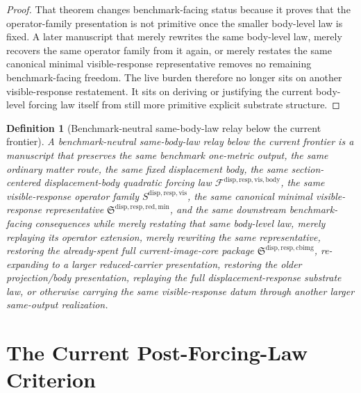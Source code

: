\documentclass[11pt]{article}
\newcommand{\VisibleBodyForcingLaw}{\mathscr F^{\mathrm{disp,resp,vis,body}}}
\newcommand{\VisibleResponseOperator}{S^{\mathrm{disp,resp,vis}}}
\newcommand{\MinimalReducedStructure}{\mathfrak S^{\mathrm{disp,resp,red,min}}}
\newcommand{\CurrentBodyImageCore}{\mathfrak S^{\mathrm{disp,resp,cbimg}}}
\newtheorem{definition}{Definition}
\begin{document}
\begin{proof}
That theorem changes benchmark-facing status because it proves that the operator-family presentation is not primitive once the smaller body-level law is fixed. A later manuscript that merely rewrites the same body-level law, merely recovers the same operator family from it again, or merely restates the same canonical minimal visible-response representative removes no remaining benchmark-facing freedom. The live burden therefore no longer sits on another visible-response restatement. It sits on deriving or justifying the current body-level forcing law itself from still more primitive explicit substrate structure.
\end{proof}

\begin{definition}[Benchmark-neutral same-body-law relay below the current frontier]
A \emph{benchmark-neutral same-body-law relay below the current frontier} is a manuscript that preserves the same benchmark one-metric output, the same ordinary matter route, the same fixed displacement body, the same section-centered displacement-body quadratic forcing law \(\VisibleBodyForcingLaw\), the same visible-response operator family \(\VisibleResponseOperator\), the same canonical minimal visible-response representative \(\MinimalReducedStructure\), and the same downstream benchmark-facing consequences while merely restating that same body-level law, merely replaying its operator extension, merely rewriting the same representative, restoring the already-spent full current-image-core package \(\CurrentBodyImageCore\), re-expanding to a larger reduced-carrier presentation, restoring the older projection/body presentation, replaying the full displacement-response substrate law, or otherwise carrying the same visible-response datum through another larger same-output realization.
\end{definition}

\section{The Current Post-Forcing-Law Criterion}
\end{document}

